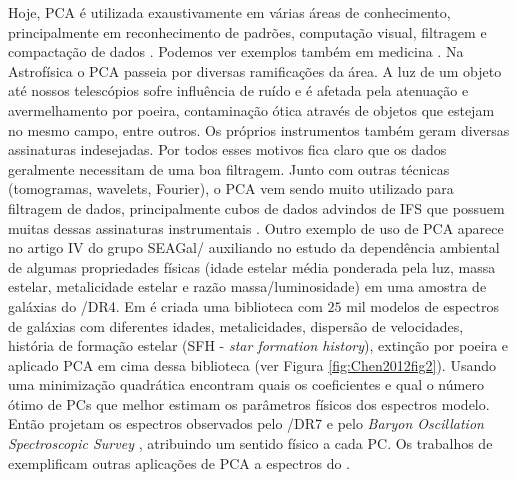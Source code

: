 Hoje, PCA é utilizada exaustivamente em várias áreas de conhecimento, principalmente em reconhecimento de padrões,
computação visual, filtragem e compactação de dados \citep{Kamruzzaman2010, Borcea2012}. Podemos ver exemplos também em
medicina \citep{Balakrishnan2013}. Na Astrofísica o PCA passeia por diversas ramificações da área. A luz de um objeto
até nossos telescópios sofre influência de ruído e é afetada pela atenuação e avermelhamento por poeira, contaminação
ótica através de objetos que estejam no mesmo campo, entre outros. Os próprios instrumentos também geram diversas
assinaturas indesejadas. Por todos esses motivos fica claro que os dados geralmente necessitam de uma boa filtragem.
Junto com outras técnicas (tomogramas, wavelets, Fourier), o PCA vem sendo muito utilizado para filtragem de dados,
principalmente cubos de dados advindos de IFS que possuem muitas dessas assinaturas instrumentais \citep{Riffel2011}.
Outro exemplo de uso de PCA aparece no artigo IV do grupo SEAGal/\starlight \citep{Mateus2007} auxiliando no estudo da
dependência ambiental de algumas propriedades físicas (idade estelar média ponderada pela luz, massa estelar,
metalicidade estelar e razão massa/luminosidade) em uma amostra de galáxias do \SDSS/DR4. Em \citet{Chen2012} é criada
uma biblioteca com $25$ mil modelos de espectros de galáxias com diferentes idades, metalicidades, dispersão de
velocidades, história de formação estelar (SFH - {\em star formation history}), extinção por poeira e aplicado PCA em
cima dessa biblioteca (ver Figura \ref{fig:Chen2012fig2}). Usando uma minimização quadrática encontram quais os
coeficientes e qual o número ótimo de PCs que melhor estimam os parâmetros físicos dos espectros modelo. Então projetam
os espectros observados pelo \SDSS/DR7 \citep{Abazajian2009} e pelo {\em Baryon Oscillation Spectroscopic Survey}
\citep[BOSS;][]{Ahn2012}, atribuindo um sentido físico a cada PC. Os trabalhos de \citet{Ferreras2006, Wild2006,
Rogers2007} exemplificam outras aplicações de PCA a espectros do \SDSS.

